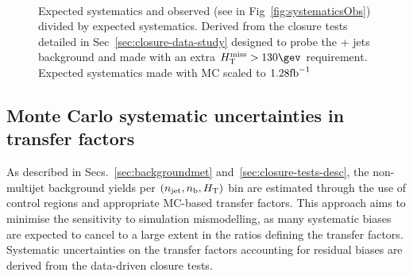 \begin{figure}[]
  \centering
   ~~
  \caption{\label{fig:systematicsExp} Expected systematics and observed
  (see in Fig~\ref{fig:systematicsObs})
  divided by expected systematics. Derived from the closure tests 
  detailed in Sec~\ref{sec:closure-data-study} designed to probe the
  \znunu + jets background and made with an extra
  $\mht>130\gev$ requirement. Expected systematics made with MC
  scaled to $1.28\text{fb}^{-1}$}
\end{figure}

\subsection{Monte Carlo systematic uncertainties in transfer factors}
\label{sec:mc-systematics}

As described in Secs.~\ref{sec:backgroundmet} and~\ref{sec:closure-tests-desc},
the non-multijet background yields per $(n_{\text{jet}},n_{\text{b}},\mbox{$H_\text{T}$})$
bin are estimated through the use of control regions and
appropriate MC-based transfer factors. This approach aims to minimise
the sensitivity to simulation mismodelling, as many systematic biases are
expected to cancel to a large extent in the ratios defining the transfer
factors. Systematic uncertainties on the transfer factors accounting for
residual biases are derived from the data-driven closure tests.

